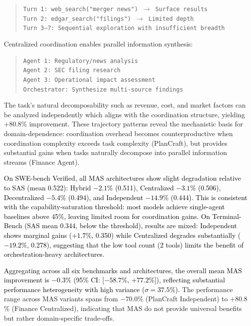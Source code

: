 \begin{quote}
\texttt{Turn 1: web\_search("merger news") $\rightarrow$ Surface results}\\
\texttt{Turn 2: edgar\_search("filings") $\rightarrow$ Limited depth}\\
\texttt{Turn 3--7: Sequential exploration with insufficient breadth}
\end{quote}
Centralized coordination enables parallel information synthesis:
\begin{quote}
\texttt{Agent 1: Regulatory/news analysis}\\
\texttt{Agent 2: SEC filing research}\\
\texttt{Agent 3: Operational impact assessment}\\
\texttt{Orchestrator: Synthesize multi-source findings}
\end{quote}
The task's natural decomposability such as revenue, cost, and market factors can be analyzed independently which aligns with the coordination structure, yielding $+80.8$\% improvement. These trajectory patterns reveal the mechanistic basis for domain-dependence: coordination overhead becomes counterproductive when coordination complexity exceeds task complexity (PlanCraft), but provides substantial gains when tasks naturally decompose into parallel information streams (Finance Agent).

\textcolor{black}{On SWE-bench Verified, all MAS architectures show slight degradation relative to SAS (mean 0.522): Hybrid $-2.1\%$ (0.511), Centralized $-3.1\%$ (0.506), Decentralized $-5.4\%$ (0.494), and Independent $-14.9\%$ (0.444). This is consistent with the capability-saturation threshold: most models achieve single-agent baselines above 45\%, leaving limited room for coordination gains. On Terminal-Bench (SAS mean 0.344, below the threshold), results are mixed: Independent shows marginal gains ($+1.7\%$, 0.350) while Centralized degrades substantially ($-19.2\%$, 0.278), suggesting that the low tool count (2 tools) limits the benefit of orchestration-heavy architectures.}

\textcolor{black}{Aggregating across all six benchmarks and architectures, the overall mean MAS improvement is $-0.3$\% (95\% CI: [$-58.7$\%, $+77.2$\%]), reflecting substantial performance heterogeneity with high variance ($\sigma = 37.5$\%).} The performance range across MAS variants spans from $-70.0$\% (PlanCraft Independent) to $+80.8$\% (Finance Centralized), indicating that MAS do not provide universal benefits but rather domain-specific trade-offs.
  
